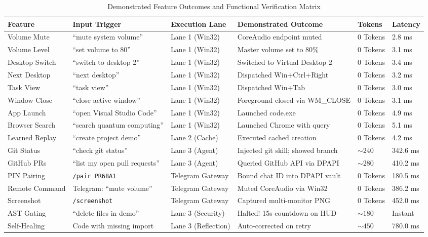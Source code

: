 \documentclass[12pt,letterpaper,oneside]{report}
\begin{document}
\begin{table}[H]
\centering
\caption{Demonstrated Feature Outcomes and Functional Verification Matrix}
\label{tab:feature_results}
\begin{tabularx}{\textwidth}{|l|X|l|X|l|l|}
\hline
\textbf{Feature} & \textbf{Input Trigger} & \textbf{Execution Lane} & \textbf{Demonstrated Outcome} & \textbf{Tokens} & \textbf{Latency}\\ \hline
Volume Mute & ``mute system volume'' & Lane 1 (Win32) & CoreAudio endpoint muted & 0 Tokens & 2.8 ms\\ \hline
Volume Level & ``set volume to 80'' & Lane 1 (Win32) & Master volume set to 80\% & 0 Tokens & 3.1 ms\\ \hline
Desktop Switch & ``switch to desktop 2'' & Lane 1 (Win32) & Switched to Virtual Desktop 2 & 0 Tokens & 3.4 ms\\ \hline
Next Desktop & ``next desktop'' & Lane 1 (Win32) & Dispatched Win+Ctrl+Right & 0 Tokens & 3.2 ms\\ \hline
Task View & ``task view'' & Lane 1 (Win32) & Dispatched Win+Tab & 0 Tokens & 3.0 ms\\ \hline
Window Close & ``close active window'' & Lane 1 (Win32) & Foreground closed via WM\_CLOSE & 0 Tokens & 3.1 ms\\ \hline
App Launch & ``open Visual Studio Code'' & Lane 1 (Win32) & Launched code.exe & 0 Tokens & 4.9 ms\\ \hline
Browser Search & ``search quantum computing'' & Lane 1 (Win32) & Launched Chrome with query & 0 Tokens & 5.1 ms\\ \hline
Learned Replay & ``create project demo'' & Lane 2 (Cache) & Executed cached creation & 0 Tokens & 4.2 ms\\ \hline
Git Status & ``check git status'' & Lane 3 (Agent) & Injected git skill; showed branch & $\sim 240$ & 342.6 ms\\ \hline
GitHub PRs & ``list my open pull requests'' & Lane 3 (Agent) & Queried GitHub API via DPAPI & $\sim 280$ & 410.2 ms\\ \hline
PIN Pairing & \texttt{/pair PR68A1} & Telegram Gateway & Bound chat ID into DPAPI vault & 0 Tokens & 180.5 ms\\ \hline
Remote Command & Telegram: ``mute volume'' & Telegram Gateway & Muted CoreAudio via Win32 & 0 Tokens & 386.2 ms\\ \hline
Screenshot & \texttt{/screenshot} & Telegram Gateway & Captured multi-monitor PNG & 0 Tokens & 452.0 ms\\ \hline
AST Gating & ``delete files in demo'' & Lane 3 (Security) & Halted! 15s countdown on HUD & $\sim 180$ & Instant\\ \hline
Self-Healing & Code with missing import & Lane 3 (Reflection) & Auto-corrected on retry & $\sim 450$ & 780.0 ms\\ \hline
\end{tabularx}
\end{table}
\end{document}

